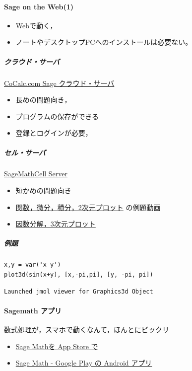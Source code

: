 \documentclass[dvipdfmx,11pat]{jarticle}
\begin{document}
\paragraph{Sage on the Web(1)}
\label{sec:org14b233f}
\begin{itemize}
\item Webで動く，
\item ノートやデスクトップPCへのインストールは必要ない。
\end{itemize}
\subparagraph{クラウド・サーバ}
\label{sec:org8ecaf47}
\href{http://www.cocalc.com/}{CoCalc.com Sage クラウド・サーバ} 
\begin{itemize}
\item 長めの問題向き，
\item プログラムの保存ができる
\item 登録とログインが必要，
\end{itemize}
\subparagraph{セル・サーバ}
\label{sec:org776db14}
\href{http://sagecell.sagemath.org/}{SageMathCell Server}
\begin{itemize}
\item 短かめの問題向き
\item \href{http://www.gregorybard.com/videos/Sage\_part1.swf}{関数，微分，積分，2次元プロット} の例題動画
\item \href{http://www.gregorybard.com/videos/Sage\_part2.swf}{因数分解，3次元プロット}
\end{itemize}
\subparagraph{例題}
\label{sec:org516c842}
\begin{verbatim}
x,y = var('x y')
plot3d(sin(x+y), [x,-pi,pi], [y, -pi, pi])
\end{verbatim}

\label{org7bd68a6}
\begin{verbatim}
Launched jmol viewer for Graphics3d Object
\end{verbatim}
\paragraph{Sagemath アプリ}
\label{sec:orga5b7eee}
数式処理が，スマホで動くなんて，ほんとにビックリ
\begin{itemize}
\item \href{https://itunes.apple.com/jp/app/sage-math/id496492945?mt=8}{Sage Mathを App Store で}
\item \href{https://play.google.com/store/apps/details?id=org.sagemath.droid\&hl=ja}{Sage Math - Google Play の Android アプリ}
\end{itemize}
\end{document}
